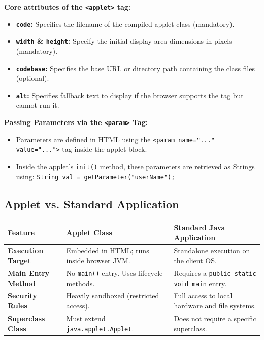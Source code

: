\documentclass[12pt,a4paper]{article}
\renewcommand{\arraystretch}{1.45}
\begin{document}
\textbf{Core attributes of the \texttt{<applet>} tag:}
\begin{itemize}[leftmargin=*, itemsep=3pt]
  \item \textbf{\texttt{code}:} Specifies the filename of the compiled applet class (mandatory).
  \item \textbf{\texttt{width} \& \texttt{height}:} Specify the initial display area dimensions in pixels (mandatory).
  \item \textbf{\texttt{codebase}:} Specifies the base URL or directory path containing the class files (optional).
  \item \textbf{\texttt{alt}:} Specifies fallback text to display if the browser supports the tag but cannot run it.
\end{itemize}

\textbf{Passing Parameters via the \texttt{<param>} Tag:}
\begin{itemize}[leftmargin=*, itemsep=3pt]
  \item Parameters are defined in HTML using the \texttt{<param name="..." value="...">} tag inside the applet block.
  \item Inside the applet's \texttt{init()} method, these parameters are retrieved as Strings using:
        \texttt{String val = getParameter("userName");}
\end{itemize}

\subsection{Applet vs. Standard Application}

\par\noindent
{\renewcommand{\arraystretch}{1.5}%
\begin{tabularx}{\linewidth}{|B{3.2cm}|Y|Y|}
\hline
\textbf{Feature} & \textbf{Applet Class} & \textbf{Standard Java Application} \\
\hline
\textbf{Execution Target} & Embedded in HTML; runs inside browser JVM. & Standalone execution on the client OS. \\
\hline
\textbf{Main Entry Method} & No \texttt{main()} entry. Uses lifecycle methods. & Requires a \texttt{public static void main} entry. \\
\hline
\textbf{Security Rules} & Heavily sandboxed (restricted access). & Full access to local hardware and file systems. \\
\hline
\textbf{Superclass Class} & Must extend \texttt{java.applet.Applet}. & Does not require a specific superclass. \\
\hline
\end{tabularx}}
\end{document}
